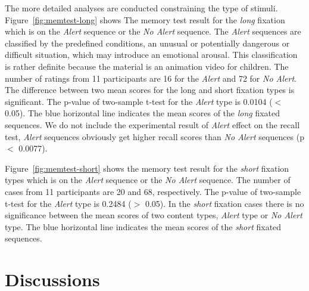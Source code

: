 \documentclass[10pt,letterpaper]{article}
\begin{document}
The more detailed analyses are conducted constraining the type of stimuli.
Figure~\ref{fig:memtest-long} shows The memory test result for the \textit{long} fixation which is on the \textit{Alert} sequence or the \textit{No Alert} sequence. The \textit{Alert} sequences are classified by the predefined conditions, an unusual or potentially dangerous or difficult situation, which may introduce an emotional arousal. This classification is rather definite because the material is an animation video for children. The number of ratings from 11 participants are 16 for the \textit{Alert} and 72 for \textit{No Alert}. The difference between two mean scores for the long and short fixation types is significant. The p-value of two-sample t-test for the \textit{Alert} type is 0.0104 ($<$ 0.05). The blue horizontal line indicates the mean scores of the \textit{long} fixated sequences. We do not include the experimental result of \textit{Alert} effect on the recall test, \textit{Alert} sequences obviously get higher recall scores than \textit{No Alert} sequences (p $<$ 0.0077).

Figure~\ref{fig:memtest-short} shows the memory test result for the \textit{short} fixation types which is on the \textit{Alert} sequence or the \textit{No Alert} sequence. The number of cases from 11 participants are 20 and 68, respectively. The p-value of two-sample t-test for the \textit{Alert} type is 0.2484 ($>$ 0.05). In the \textit{short} fixation cases there is no significance between the mean scores of two content types, \textit{Alert} type or \textit{No Alert} type. The blue horizontal line indicates the mean scores of the \textit{short} fixated sequences.

\section{Discussions}
\end{document}
